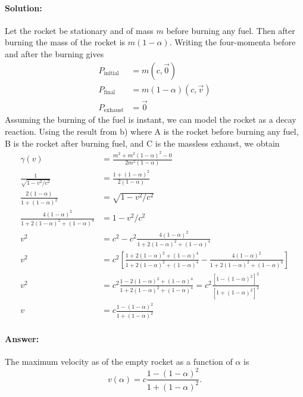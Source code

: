 \paragraph{Solution:} Let the rocket be stationary and of mass $m$ before burning any fuel. Then after burning the mass of the rocket is $m(1 - \alpha)$. Writing the four-momenta before and after the burning gives
\begin{align*}
    P_\text{initial} &= m (c, \vec{0})\\
    P_\text{final} &= m(1-\alpha) (c, \vec{v})\\
    P_\text{exhaust} &= \vec{0}
\end{align*}
Assuming the burning of the fuel is instant, we can model the rocket as a decay reaction. Using the result from b) where A is the rocket before burning any fuel, B is the rocket after burning fuel, and C is the massless exhaust, we obtain
\begin{align*}
    \gamma(v) &= \frac{m^2 + m^2(1-\alpha)^2 - 0}{2 m^2(1-\alpha)}\\
    \frac{1}{\sqrt{1 - v^2 / c^2}} &= \frac{1 + (1-\alpha)^2}{2 (1 -\alpha)}\\
    \frac{2 (1 - \alpha)}{1 + (1- \alpha)^2} &= \sqrt{1 - v^2 / c^2}\\
    \frac{4 (1- \alpha)^2}{1 + 2(1 - \alpha)^2 + (1 - \alpha)^4} &= 1 - v^2 / c^2\\
    v^2 &= c^2 - c^2 \frac{4 (1- \alpha)^2}{1 + 2(1 - \alpha)^2 + (1 - \alpha)^4}\\
    v^2 &= c^2 \left[ \frac{1 + 2(1 - \alpha)^2 + (1 - \alpha)^4}{1 + 2(1 - \alpha)^2 + (1 - \alpha)^4} - \frac{4 (1- \alpha)^2}{1 + 2(1 - \alpha)^2 + (1 - \alpha)^4}\right]\\
    v^2 &= c^2  \frac{1 - 2(1 - \alpha)^2 + (1 - \alpha)^4}{1 + 2(1 - \alpha)^2 + (1 - \alpha)^4} = c^2 \frac{\left[ 1 - (1 - \alpha)^2 \right]^2}{\left[ 1 + (1 - \alpha)^2 \right]^2}\\
    v &= c \frac{ 1 - (1 - \alpha)^2}{1 + (1 - \alpha)^2}
\end{align*}

\paragraph{Answer:} The maximum velocity as of the empty rocket as a function of $\alpha$ is 
\begin{equation*}
    v(\alpha) = c \frac{ 1 - (1 - \alpha)^2}{1 + (1 - \alpha)^2}.
\end{equation*}